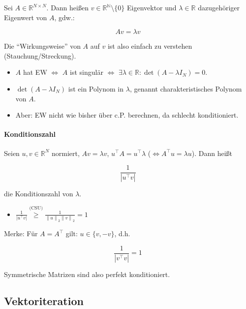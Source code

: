 \documentclass[a4paper, 14pt]{article}
\newcommand{\norm}[1]{\left\lVert#1\right\rVert}
\begin{document}
	Sei $A \in \mathbb{R}^{N \times N}$. Dann heißen $v \in \mathbb{R^N} \setminus \{ 0 \}$ Eigenvektor und $\lambda \in \mathbb{R}$ dazugehöriger Eigenwert von $A$, gdw.:

	\begin{equation}
		A v = \lambda v
	\end{equation}

	Die \enquote{Wirkungsweise} von $A$ auf $v$ ist also einfach zu verstehen (Stauchung/Streckung).

	\begin{itemize}
		\item $A$ hat EW $\Leftrightarrow$ $A$ ist singulär $\Leftrightarrow$ $\exists \lambda \in \mathbb{R} : \det(A - \lambda I_N) = 0$.
		\item $\det(A - \lambda I_N)$ ist ein Polynom in $\lambda$, genannt charakteristisches Polynom von $A$.
		\item Aber: EW nicht wie bisher über c.P. berechnen, da schlecht konditioniert.
	\end{itemize}

	\paragraph{Konditionszahl}

	Seien $u, v \in \mathbb{R}^N$ normiert, $A v = \lambda v$, $u^\top A = u^\top \lambda$ ($\Leftrightarrow A^\top u = \lambda u$).
	Dann heißt

	\begin{equation}
		\frac{1}{|u^{\top} v|}
	\end{equation}

	die Konditionszahl von $\lambda$.

	\begin{itemize}
		\item $\frac{1}{|u^{\top} v|} \stackrel{\textrm{(CSU)}}{\geq} \frac{1}{\norm{u}_2 \norm{v}_2} = 1$
	\end{itemize}

	Merke: Für $A = A^\top$ gilt: $u \in \{ v, -v \}$, d.h.
	
	\begin{equation}
		\frac{1}{|v^\top v|} = 1
	\end{equation}

	Symmetrische Matrizen sind also perfekt konditioniert.

	\subsection{Vektoriteration}
\end{document}

